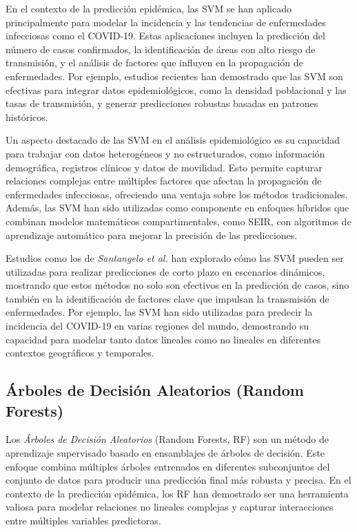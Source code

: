 En el contexto de la predicción epidémica, las SVM se han aplicado principalmente para modelar la incidencia y las tendencias de enfermedades infecciosas como el COVID-19. Estas aplicaciones incluyen la predicción del número de casos confirmados, la identificación de áreas con alto riesgo de transmisión, y el análisis de factores que influyen en la propagación de enfermedades. Por ejemplo, estudios recientes han demostrado que las SVM son efectivas para integrar datos epidemiológicos, como la densidad poblacional y las tasas de transmisión, y generar predicciones robustas basadas en patrones históricos\parencite{Santangelo2023MachineLearning, Rodriguez2022DataCentric}.

Un aspecto destacado de las SVM en el análisis epidemiológico es su capacidad para trabajar con datos heterogéneos y no estructurados, como información demográfica, registros clínicos y datos de movilidad\parencite{Shah2024COVID19FU}. Esto permite capturar relaciones complejas entre múltiples factores que afectan la propagación de enfermedades infecciosas, ofreciendo una ventaja sobre los métodos tradicionales. Además, las SVM han sido utilizadas como componente en enfoques híbridos que combinan modelos matemáticos compartimentales, como SEIR, con algoritmos de aprendizaje automático para mejorar la precisión de las predicciones\parencite{Baccega2024Sybil, Stergiou2022MachineLearning}.

Estudios como los de \textit{Santangelo et al.} han explorado cómo las SVM pueden ser utilizadas para realizar predicciones de corto plazo en escenarios dinámicos, mostrando que estos métodos no solo son efectivos en la predicción de casos, sino también en la identificación de factores clave que impulsan la transmisión de enfermedades\parencite{Santangelo2023MachineLearning, Rodriguez2022DataCentric}. Por ejemplo, las SVM han sido utilizadas para predecir la incidencia del COVID-19 en varias regiones del mundo, demostrando su capacidad para modelar tanto datos lineales como no lineales en diferentes contextos geográficos y temporales\parencite{Shah2024COVID19FU}.

\subsection{Árboles de Decisión Aleatorios (Random Forests)}\label{section:random-forests}

Los \textit{Árboles de Decisión Aleatorios} (Random Forests, RF) son un método de aprendizaje supervisado basado en ensamblajes de árboles de decisión. Este enfoque combina múltiples árboles entrenados en diferentes subconjuntos del conjunto de datos para producir una predicción final más robusta y precisa. En el contexto de la predicción epidémica, los RF han demostrado ser una herramienta valiosa para modelar relaciones no lineales complejas y capturar interacciones entre múltiples variables predictoras\parencite{Stergiou2022MachineLearning}.

